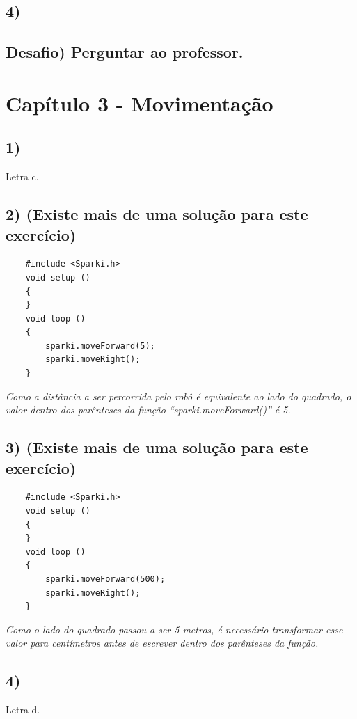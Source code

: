     \subsection*{4)}

    
    \subsection*{Desafio) Perguntar ao professor.}

\section*{Capítulo 3 - Movimentação}

    \subsection*{1)}
    Letra c.
    
    \subsection*{2) (Existe mais de uma solução para este exercício)}

    \begin{verbatim}
    #include <Sparki.h>
    void setup ()
    {
    }
    void loop ()
    {
        sparki.moveForward(5);
        sparki.moveRight();
    }
    \end{verbatim}
    
    \textsl{Como a distância a ser percorrida pelo robô é equivalente ao lado do quadrado, o valor dentro dos parênteses da função ``sparki.moveForward()'' é 5.}
    
    \subsection*{3) (Existe mais de uma solução para este exercício)} 
    
    \begin{verbatim}
    #include <Sparki.h>
    void setup ()
    {
    }
    void loop ()
    {
        sparki.moveForward(500);
        sparki.moveRight();
    }
    \end{verbatim}
    
    \textsl{Como o lado do quadrado passou a ser 5 metros, é necessário transformar esse valor para centímetros antes de escrever dentro dos parênteses da função.}
    
    \subsection*{4)}
    Letra d.
    
